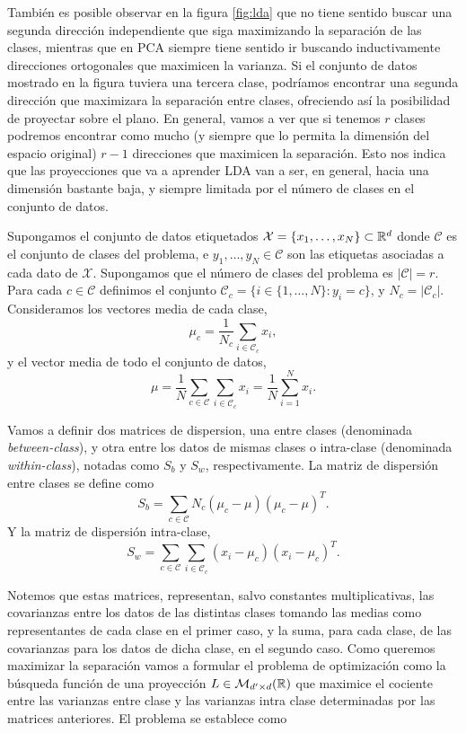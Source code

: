 \documentclass{book}
\begin{document}
También es posible observar en la figura \ref{fig:lda} que no tiene sentido buscar una segunda dirección independiente que siga maximizando la separación de las clases, mientras que en PCA siempre tiene sentido ir buscando inductivamente direcciones ortogonales que maximicen la varianza. Si el conjunto de datos mostrado en la figura tuviera una tercera clase, podríamos encontrar una segunda dirección que maximizara la separación entre clases, ofreciendo así la posibilidad de proyectar sobre el plano. En general, vamos a ver que si tenemos $r$ clases podremos encontrar como mucho (y siempre que lo permita la dimensión del espacio original) $r-1$ direcciones que maximicen la separación. Esto nos indica que las proyecciones que va a aprender LDA van a ser, en general, hacia una dimensión bastante baja, y siempre limitada por el número de clases en el conjunto de datos.

Supongamos el conjunto de datos etiquetados $\mathcal{X} = \{x_1,\dots,x_N\} \subset \mathbb{R}^d$ donde $\mathcal{C}$ es el conjunto de clases del problema, e $y_1,\dots,y_N \in \mathcal{C}$ son las etiquetas asociadas a cada dato de $\mathcal{X}$. Supongamos que el número de clases del problema es $|\mathcal{C}| = r$. Para cada $c \in \mathcal{C}$ definimos el conjunto $\mathcal{C}_c = \{ i \in \{1,\dots,N\} \colon y_i = c \}$, y $N_c = |\mathcal{C}_c|$. Consideramos los vectores media de cada clase,
\[\mu_c = \frac{1}{N_c} \sum_{i \in \mathcal{C}_c} x_i,\]
y el vector media de todo el conjunto de datos,
\[\mu = \frac{1}{N}\sum_{c \in \mathcal{C}}\sum_{i \in \mathcal{C}_c}x_i = \frac{1}{N}\sum_{i=1}^N x_i. \]

Vamos a definir dos matrices de dispersion, una entre clases (denominada \emph{between-class}), y otra entre los datos de mismas clases o intra-clase (denominada \emph{within-class}), notadas como $S_b$ y $S_w$, respectivamente. La matriz de dispersión entre clases se define como
\begin{equation}
	S_b = \sum_{c \in \mathcal{C}} N_c(\mu_c - \mu)(\mu_c - \mu)^T.
\end{equation}
Y la matriz de dispersión intra-clase,
\begin{equation}
	S_w = \sum_{c \in \mathcal{C}} \sum_{i \in \mathcal{C}_c}(x_i- \mu_c)(x_i - \mu_c)^T.
\end{equation}  

Notemos que estas matrices, representan, salvo constantes multiplicativas, las covarianzas entre los datos de las distintas clases tomando las medias como representantes de cada clase en el primer caso, y la suma, para cada clase, de las covarianzas para los datos de dicha clase, en el segundo caso. Como queremos maximizar la separación vamos a formular el problema de optimización como la búsqueda función de una proyección $L \in \mathcal{M}_{d'\times d}(\mathbb{R})$ que maximice el cociente entre las varianzas entre clase y las varianzas intra clase determinadas por las matrices anteriores. El problema se establece como
\end{document}
